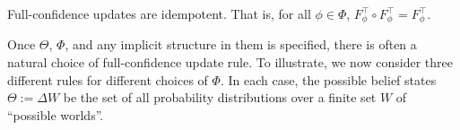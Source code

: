 \begin{subappendices}
    \begin{LrnAxioms}
    	\item
    	Full-confidence updates are idempotent.
        That is, for all $\phi \in \Phi$,  $F^\top_\phi \circ F^\top_\phi = F^\top_\phi$.
    	\label{ax:idemp}
    \end{LrnAxioms}


    Once $\Theta$, $\Phi$, and any implicit structure in them is specified, there is often a natural choice of full-confidence update rule.
    To illustrate, we now consider three different rules for different choices of $\Phi$.
    In each case, the possible belief states $\Theta := \Delta W$ be the set of all probability distributions over a finite set
     $W
      $ of ``possible worlds''.


\end{subappendices}
